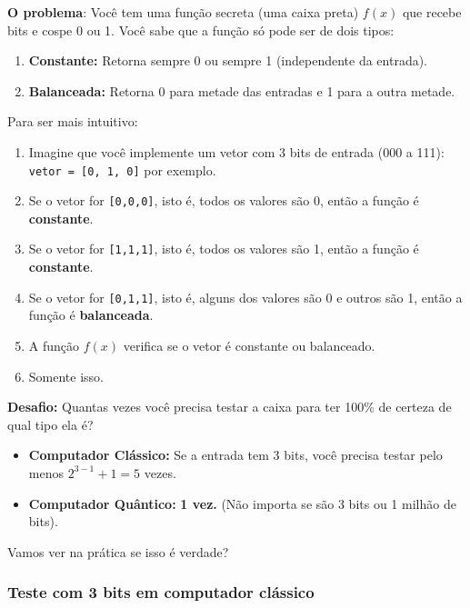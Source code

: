 \documentclass[
  brazilian,
]{report}
\providecommand{\tightlist}{%
  \setlength{\itemsep}{0pt}\setlength{\parskip}{0pt}}
\begin{document}
\textbf{O problema}: Você tem uma função secreta (uma caixa preta)
\(f(x)\) que recebe bits e cospe 0 ou 1. Você sabe que a função só pode
ser de dois tipos:

\begin{enumerate}
\def\labelenumi{\arabic{enumi}.}
\tightlist
\item
  \textbf{Constante:} Retorna sempre 0 ou sempre 1 (independente da
  entrada).
\item
  \textbf{Balanceada:} Retorna 0 para metade das entradas e 1 para a
  outra metade.
\end{enumerate}

Para ser mais intuitivo:

\begin{enumerate}
\def\labelenumi{\arabic{enumi}.}
\tightlist
\item
  Imagine que você implemente um vetor com 3 bits de entrada (000 a
  111): \texttt{vetor\ =\ {[}0,\ 1,\ 0{]}} por exemplo.
\item
  Se o vetor for \texttt{{[}0,0,0{]}}, isto é, todos os valores são 0,
  então a função é \textbf{constante}.
\item
  Se o vetor for \texttt{{[}1,1,1{]}}, isto é, todos os valores são 1,
  então a função é \textbf{constante}.
\item
  Se o vetor for \texttt{{[}0,1,1{]}}, isto é, alguns dos valores são 0
  e outros são 1, então a função é \textbf{balanceada}.
\item
  A função \(f(x)\) verifica se o vetor é constante ou balanceado.
\item
  Somente isso.
\end{enumerate}

\textbf{Desafio:} Quantas vezes você precisa testar a caixa para ter
100\% de certeza de qual tipo ela é?

\begin{itemize}
\tightlist
\item
  \textbf{Computador Clássico:} Se a entrada tem 3 bits, você precisa
  testar pelo menos \(2^{3-1} + 1 = 5\) vezes.
\item
  \textbf{Computador Quântico:} \textbf{1 vez.} (Não importa se são 3
  bits ou 1 milhão de bits).
\end{itemize}

Vamos ver na prática se isso é verdade?

\subsubsection{Teste com 3 bits em computador
clássico}\label{teste-com-3-bits-em-computador-cluxe1ssico}
\end{document}
